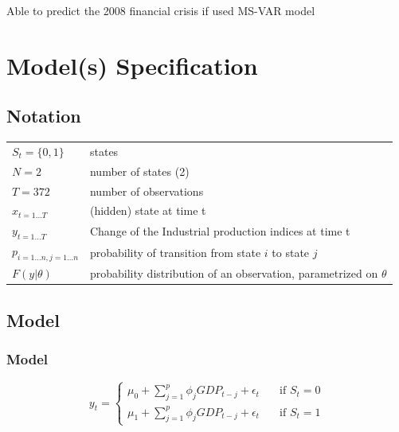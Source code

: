 \documentclass[12pt,a4paper,oneside]{book}
\begin{document}
Able to predict the 2008 financial crisis if used MS-VAR model \cite{gadea_rivas_failure_2015}




\section{Model(s) Specification}

\subsection{Notation}

\begin{tabular}{l l}
    $S_t = \{0, 1\}$&   states        \\
    $N = 2$         &   number of states (2) \\
    $T = 372 $            & 	number of observations  \\
    $x_{t=1\dots T}$ & (hidden) state at time t \\
    $y_{t=1\dots T}$ 	& Change of the Industrial production indices at time t \\
    $p_{i=1\dots n,j=1\dots n}$ & probability of transition from state $i$ to state $j$ \\
    $F(y|\theta )$	&  probability distribution of an observation, parametrized on $\theta$ \\
\end{tabular}



\subsection{Model}

\subsubsection{Model}




\begin{equation}
y_{t} =   
  \begin{cases}
    \mu_{0} + \sum^p_{j = 1} \phi_j GDP_{t-j} + \epsilon_t      & \quad \text{if } S_t = 0 \\
    \mu_{1} + \sum^p_{j = 1} \phi_j GDP_{t-j} + \epsilon_t      & \quad \text{if } S_t = 1
  \end{cases}
\end{equation}
\end{document}
